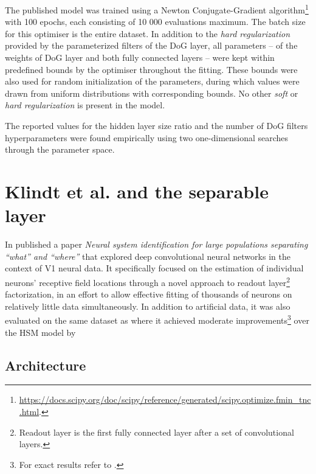 The published model was trained using a Newton Conjugate-Gradient algorithm\footnote{\href{https://docs.scipy.org/doc/scipy/reference/generated/scipy.optimize.fmin_tnc.html}{https://docs.scipy.org/doc/scipy/reference/generated/scipy.optimize.fmin\_tnc.html}.} with 100 epochs, each consisting of 10 000 evaluations maximum. The batch size for this optimiser is the entire dataset. In addition to the \textit{hard regularization} provided by the parameterized filters of the DoG layer, all parameters -- of the weights of DoG layer and both fully connected layers -- were kept within predefined bounds by the optimiser throughout the fitting. These bounds were also used for random initialization of the parameters, during which values were drawn from uniform distributions with corresponding bounds. No other \textit{soft} or \textit{hard regularization} is present in the model. 

The reported values for the hidden layer size ratio and the number of DoG filters hyperparameters were found empirically using two one-dimensional searches through the parameter space.

\section{Klindt et al. and the separable layer}\label{ch:2.2}

In \citeyear{klindt} \citeauthor{klindt} published a paper \textit{Neural system identification for large populations separating “what” and “where”} that explored deep convolutional neural networks in the context of V1 neural data. It specifically focused on the estimation of individual neurons’ receptive field locations through a novel approach to readout layer\footnote{Readout layer is the first fully connected layer after a set of convolutional layers.} factorization, in an effort to allow effective fitting of thousands of neurons on relatively little data simultaneously. In addition to artificial data, it was also evaluated on the same dataset as \cite{antolik} where it achieved moderate improvements\footnote{For exact results refer to .} over the HSM model by \citeauthor{antolik}

\subsection{Architecture}

